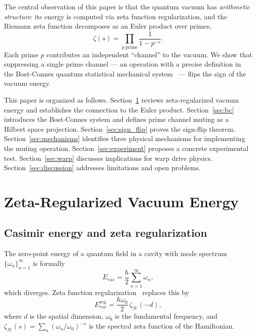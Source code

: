 \documentclass[aps,prd,twocolumn,superscriptaddress,nofootinbib]{revtex4-2}
\begin{document}
The central observation of this paper is that the quantum vacuum has
\emph{arithmetic structure}: its energy is computed via zeta function
regularization, and the Riemann zeta function decomposes as an
Euler product over primes,
\begin{equation}
  \zeta(s) = \prod_{p\ \mathrm{prime}} \frac{1}{1 - p^{-s}}.
  \label{eq:euler}
\end{equation}
Each prime $p$ contributes an independent ``channel'' to the vacuum.
We show that suppressing a single prime channel --- an operation
with a precise definition in the Bost-Connes quantum statistical
mechanical system~\cite{BostConnes1995} --- flips the sign of the
vacuum energy.

This paper is organized as follows.
Section~\ref{sec:vacuum} reviews zeta-regularized vacuum energy
and establishes the connection to the Euler product.
Section~\ref{sec:bc} introduces the Bost-Connes system and defines
prime channel muting as a Hilbert space projection.
Section~\ref{sec:sign_flip} proves the sign-flip theorem.
Section~\ref{sec:mechanisms} identifies three physical mechanisms
for implementing the muting operation.
Section~\ref{sec:experiment} proposes a concrete experimental test.
Section~\ref{sec:warp} discusses implications for warp drive physics.
Section~\ref{sec:discussion} addresses limitations and open problems.

\section{Zeta-Regularized Vacuum Energy}
\label{sec:vacuum}

\subsection{Casimir energy and zeta regularization}

The zero-point energy of a quantum field in a cavity with mode
spectrum $\{\omega_n\}_{n=1}^\infty$ is formally
\begin{equation}
  E_{\mathrm{vac}} = \frac{\hbar}{2} \sum_{n=1}^{\infty} \omega_n,
  \label{eq:vac_div}
\end{equation}
which diverges. Zeta function regularization~\cite{Hawking1977,Elizalde1995}
replaces this by
\begin{equation}
  E_{\mathrm{vac}}^{\mathrm{reg}} = \frac{\hbar\omega_0}{2}\, \zeta_{\mathcal{H}}(-d),
  \label{eq:vac_reg}
\end{equation}
where $d$ is the spatial dimension, $\omega_0$ is the fundamental
frequency, and $\zeta_{\mathcal{H}}(s) = \sum_n (\omega_n / \omega_0)^{-s}$
is the spectral zeta function of the Hamiltonian.
\end{document}
